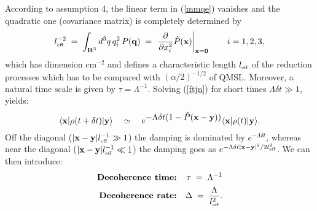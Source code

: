\documentclass[10pt,a4paper]{article}
\begin{document}
According to assumption 4, the linear term in (\ref{mmqe}) vanishes
and the quadratic one (covariance matrix) is completely determined
by
\begin{equation}
l^{-2}_{\makebox{\tiny eff}} \; = \; \int_{{\bf R}^{3}} d^{3}q\,
q_{i}^{2}\, P({\bf q}) \; = \; \left. \frac{\partial}{\partial
x_{i}^{2}} \hat{P}({\bf x}) \right|_{{\bf x} = {\bf 0}} \qquad i =
1,2,3,
\end{equation}
which has dimension cm${}^{-2}$ and defines a characteristic
length $l_{\makebox{\tiny eff}}$ of the reduction processes which has  to
be compared with $(\alpha/2)^{-1/2}$ of QMSL. Moreover, a natural
time scale is given by $\tau = \Lambda^{-1}$. Solving (\ref{ftjn})
for short times $\Lambda \delta t \gg 1$, yields:
\begin{equation}
\langle {\bf x}| \rho(t + \delta t) |{\bf y} \rangle \quad \simeq
\quad e^{\displaystyle -\Lambda \delta t (1 - \hat{P}({\bf x} -
{\bf y}))}\langle {\bf x}| \rho(t) |{\bf y} \rangle.
\end{equation}
Off the diagonal ($|{\bf x} - {\bf y}|l^{-1}_{\makebox{\tiny eff}}
\gg 1$) the damping is dominated by $e^{-\Lambda \delta t}$,
whereas near the diagonal ($|{\bf x} - {\bf
y}|l^{-1}_{\makebox{\tiny eff}} \ll 1$) the damping goes as
$e^{-\Lambda \delta t |{\bf x} - {\bf y}|^{2} / 2
l^{2}_{\makebox{\tiny eff}}}$. We can then introduce:
\begin{eqnarray} \label{ctqmsl}
\makebox{\bf Decoherence time:} & & \tau  \; = \; \Lambda^{-1} \\
\makebox{\bf Decoherence rate:} & & \Delta \; = \;
\frac{\Lambda}{l^{2}_{\makebox{\tiny eff}}}.
\end{eqnarray}
\end{document}
